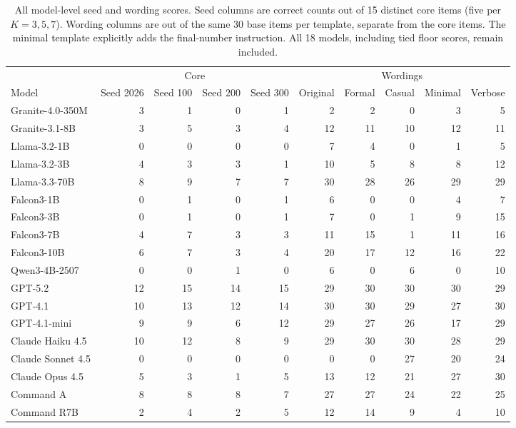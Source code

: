 \begin{table}[t]
\centering
\footnotesize
\setlength{\tabcolsep}{3pt}
\begin{tabular}{lrrrrrrrrr}
\toprule
 & \multicolumn{4}{c}{Core} & \multicolumn{5}{c}{Wordings} \\
\cmidrule(lr){2-5}\cmidrule(lr){6-10}
Model & Seed 2026 & Seed 100 & Seed 200 & Seed 300 & Original & Formal & Casual & Minimal & Verbose \\
\midrule
Granite-4.0-350M & 3 & 1 & 0 & 1 & 2 & 2 & 0 & 3 & 5 \\
Granite-3.1-8B & 3 & 5 & 3 & 4 & 12 & 11 & 10 & 12 & 11 \\
Llama-3.2-1B & 0 & 0 & 0 & 0 & 7 & 4 & 0 & 1 & 5 \\
Llama-3.2-3B & 4 & 3 & 3 & 1 & 10 & 5 & 8 & 8 & 12 \\
Llama-3.3-70B & 8 & 9 & 7 & 7 & 30 & 28 & 26 & 29 & 29 \\
Falcon3-1B & 0 & 1 & 0 & 1 & 6 & 0 & 0 & 4 & 7 \\
Falcon3-3B & 0 & 1 & 0 & 1 & 7 & 0 & 1 & 9 & 15 \\
Falcon3-7B & 4 & 7 & 3 & 3 & 11 & 15 & 1 & 11 & 16 \\
Falcon3-10B & 6 & 7 & 3 & 4 & 20 & 17 & 12 & 16 & 22 \\
Qwen3-4B-2507 & 0 & 0 & 1 & 0 & 6 & 0 & 6 & 0 & 10 \\
GPT-5.2 & 12 & 15 & 14 & 15 & 29 & 30 & 30 & 30 & 29 \\
GPT-4.1 & 10 & 13 & 12 & 14 & 30 & 30 & 29 & 27 & 30 \\
GPT-4.1-mini & 9 & 9 & 6 & 12 & 29 & 27 & 26 & 17 & 29 \\
Claude Haiku 4.5 & 10 & 12 & 8 & 9 & 29 & 30 & 30 & 28 & 29 \\
Claude Sonnet 4.5 & 0 & 0 & 0 & 0 & 0 & 0 & 27 & 20 & 24 \\
Claude Opus 4.5 & 5 & 3 & 1 & 5 & 13 & 12 & 21 & 27 & 30 \\
Command A & 8 & 8 & 8 & 7 & 27 & 27 & 24 & 22 & 25 \\
Command R7B & 2 & 4 & 2 & 5 & 12 & 14 & 9 & 4 & 10 \\
\bottomrule
\end{tabular}
\caption{All model-level seed and wording scores. Seed columns are correct counts out of 15 distinct core items (five per $K=3,5,7$). Wording columns are out of the same 30 base items per template, separate from the core items. The minimal template explicitly adds the final-number instruction. All 18 models, including tied floor scores, remain included.}
\label{tab:stability-by-model}
\end{table}
